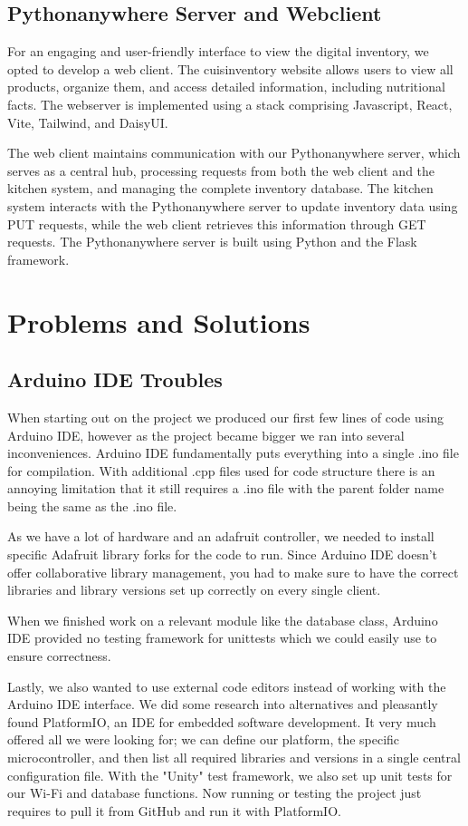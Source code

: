 \documentclass{article}
\begin{document}
\subsection{Pythonanywhere Server and Webclient}
For an engaging and user-friendly interface to view the digital inventory, we opted to develop a web client. The cuisinventory website allows users to view all products, organize them, and access detailed information, including nutritional facts. The webserver is implemented using a stack comprising Javascript, React, Vite, Tailwind, and DaisyUI.

The web client maintains communication with our Pythonanywhere server, which serves as a central hub, processing requests from both the web client and the kitchen system, and managing the complete inventory database. The kitchen system interacts with the Pythonanywhere server to update inventory data using PUT requests, while the web client retrieves this information through GET requests. The Pythonanywhere server is built using Python and the Flask framework.

\section{Problems and Solutions}

\subsection{Arduino IDE Troubles}
When starting out on the project we produced our first few lines of code using Arduino IDE, however as the project became bigger we ran into several inconveniences.
Arduino IDE fundamentally puts everything into a single .ino file for compilation. With additional .cpp files used for code structure there is an annoying limitation that it still requires a .ino file with the parent folder name being the same as the .ino file.

As we have a lot of hardware and an adafruit controller, we needed to install specific Adafruit library forks for the code to run.
Since Arduino IDE doesn't offer collaborative library management, you had to make sure to have the correct libraries and library versions set up correctly on every single client.

When we finished work on a relevant module like the database class, Arduino IDE provided no testing framework for unittests which we could easily use to ensure correctness.

Lastly, we also wanted to use external code editors instead of working with the Arduino IDE interface.
We did some research into alternatives and pleasantly found PlatformIO, an IDE for embedded software development.
It very much offered all we were looking for; we can define our platform, the specific microcontroller, and then list all required libraries and versions in a single central configuration file.
With the "Unity" test framework, we also set up unit tests for our Wi-Fi and database functions.
Now running or testing the project just requires to pull it from GitHub and run it with PlatformIO.
\end{document}
